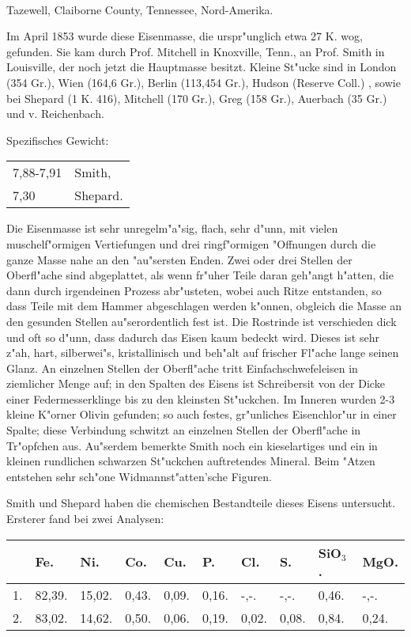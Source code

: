 \documentclass[a4paper, 11pt, oneside]{article}
\begin{document}
\paragraph{}
Tazewell, Claiborne County, Tennessee, Nord-Amerika.

Im April 1853 wurde diese Eisenmasse, die urspr"unglich etwa 27 K. wog, gefunden. Sie kam durch Prof. Mitchell in Knoxville, Tenn., an Prof. Smith in Louisville, der noch jetzt die Hauptmasse besitzt. Kleine St"ucke sind in London (354 Gr.), Wien (164,6 Gr.), Berlin (113,454 Gr.), Hudson (Reserve Coll.) , sowie bei Shepard (1 K. 416), Mitchell (170 Gr.), Greg (158 Gr.), Auerbach (35 Gr.) und v. Reichenbach.

Spezifisches Gewicht:  
\begin{table}[!ht]
    \centering\swabfamily\Large
    \begin{tabular}{l l}
        7,88-7,91 & Smith,\\
        7,30 & Shepard.
    \end{tabular}
\end{table}

Die Eisenmasse ist sehr unregelm"a"sig, flach, sehr d"unn, mit vielen muschelf"ormigen Vertiefungen und drei ringf"ormigen "Offnungen durch die ganze Masse nahe an den "au"sersten Enden. Zwei oder drei Stellen der Oberfl"ache sind abgeplattet, als wenn fr"uher Teile daran geh"angt h"atten, die dann durch irgendeinen Prozess abr"usteten, wobei auch Ritze entstanden, so dass Teile mit dem Hammer abgeschlagen werden k"onnen, obgleich die Masse an den gesunden Stellen au"serordentlich fest ist. Die Rostrinde ist verschieden dick und oft so d"unn, dass dadurch das Eisen kaum bedeckt wird. Dieses ist sehr z"ah, hart, silberwei"s, kristallinisch und beh"alt auf frischer Fl"ache lange seinen Glanz. An einzelnen Stellen der Oberfl"ache tritt Einfachschwefeleisen in ziemlicher Menge auf; in den Spalten des Eisens ist Schreibersit von der Dicke einer Federmesserklinge bis zu den kleinsten St"uckchen. Im Inneren wurden 2-3 kleine K"orner Olivin gefunden; so auch festes, gr"unliches Eisenchlor"ur in einer Spalte; diese Verbindung schwitzt an einzelnen Stellen der Oberfl"ache in Tr"opfchen aus. Au"serdem bemerkte Smith noch ein kieselartiges und ein in kleinen rundlichen schwarzen St"uckchen auftretendes Mineral. Beim "Atzen entstehen sehr sch"one Widmannst"atten'sche Figuren.

Smith und Shepard haben die chemischen Bestandteile dieses Eisens untersucht. Ersterer fand bei zwei Analysen:
\begin{table}[H]
    \centering\swabfamily\Large
    \begin{tabular}{l l l l l l l l l l}
         & Fe. & Ni. & Co. & Cu. & P. & Cl. & S. & SiO$_{3}$. & MgO. \\ \hline
        1. & 82,39. & 15,02. & 0,43. & 0,09. & 0,16. & -,-. & -,-. & 0,46. & -,-. \\
        2. & 83,02. & 14,62. & 0,50. & 0,06. & 0,19. & 0,02. & 0,08. & 0,84. & 0,24. \\
    \end{tabular}
\end{table}
\end{document}
